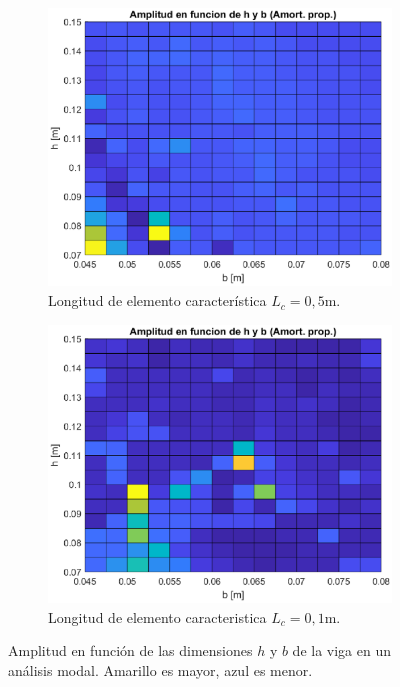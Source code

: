 \documentclass[onecolumn,10pt,titlepage,a4paper]{article}
\begin{document}
\begin{figure}[htb!]
	\centering
	\begin{subfigure}{0.49\textwidth}
		\includegraphics[width=\linewidth]{fig/amplitudVshbProp.eps}
		\caption{Longitud de elemento característica $L_c=0,5$m.}
		\label{fig:amplitudVshbProp}
	\end{subfigure}
	\hfill
	\begin{subfigure}{0.49\textwidth}
		\includegraphics[width=\linewidth]{fig/amplitudVshbPropLc01.eps}
		\caption{Longitud de elemento caracteristica $L_c=0,1$m.}
		\label{fig:amplitudVshbProp}
	\end{subfigure}
	\caption{Amplitud en función de las dimensiones $h$ y $b$ de la viga en un análisis modal. Amarillo es mayor, azul es menor.}
\end{figure}
\end{document}
